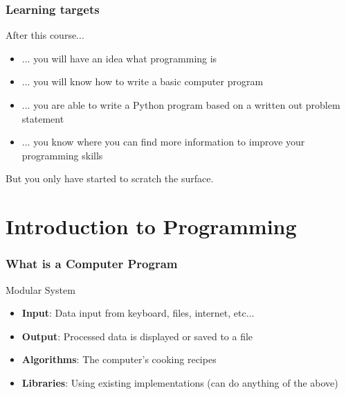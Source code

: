 \documentclass[10pt, a4paper]{beamer} %
\begin{document}
\begin{frame}[c]\frametitle{Learning targets}

	After this course...
	\begin{itemize}
		\item ... you will have an idea what programming is
		\item ... you will know how to write a basic computer program
		\item ... you are able to write a Python program based on a written out
		      problem statement
		\item ... you know where you can find more information to improve your
		      programming skills
	\end{itemize}

	But you only have started to scratch the surface.
\end{frame}


\section{Introduction to Programming} %
\label{sec:introduction_to_programming}

\begin{frame}[c]\frametitle{What is a Computer Program}
	\begin{block}{Modular System}
		\begin{itemize}
			\item \textbf{Input}: Data input from keyboard, files, internet, etc...
			\item \textbf{Output}: Processed data is displayed or saved to a file
			\item \textbf{Algorithms}: The computer's cooking recipes
			\item \textbf{Libraries}: Using existing implementations (can do anything of the above)
		\end{itemize}

	\end{block}
\end{frame}
\end{document}
